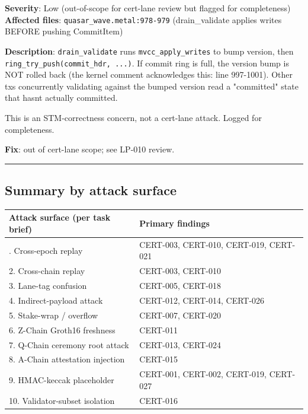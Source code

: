 \documentclass[
]{article}
\newcounter{none} %
\begin{document}
\textbf{Severity}: Low (out-of-scope for cert-lane review but flagged
for completeness) \textbf{Affected files}:
\texttt{quasar\_wave.metal:978-979} (drain\_validate applies writes
BEFORE pushing CommitItem)

\textbf{Description}: \texttt{drain\_validate} runs
\texttt{mvcc\_apply\_writes} to bump version, then
\texttt{ring\_try\_push(commit\_hdr,\ ...)}. If commit ring is full, the
version bump is NOT rolled back (the kernel comment acknowledges this:
line 997-1001). Other txs concurrently validating against the bumped
version read a "committed" state that hasn\textquotesingle t actually
committed.

This is an STM-correctness concern, not a cert-lane attack. Logged for
completeness.

\textbf{Fix}: out of cert-lane scope; see LP-010 review.

\begin{center}\rule{0.5\linewidth}{0.5pt}\end{center}

\subsection{Summary by attack surface}\label{summary-by-attack-surface}

{\def\LTcaptype{none} %
\begin{longtable}[]{@{}ll@{}}
\toprule\noalign{}
Attack surface (per task brief) & Primary findings \\
\midrule\noalign{}
\endhead
\bottomrule\noalign{}
\endlastfoot
1. Cross-epoch replay & CERT-003, CERT-010, CERT-019, CERT-021 \\
2. Cross-chain replay & CERT-003, CERT-010 \\
3. Lane-tag confusion & CERT-005, CERT-018 \\
4. Indirect-payload attack & CERT-012, CERT-014, CERT-026 \\
5. Stake-wrap / overflow & CERT-007, CERT-020 \\
6. Z-Chain Groth16 freshness & CERT-011 \\
7. Q-Chain ceremony root attack & CERT-013, CERT-024 \\
8. A-Chain attestation injection & CERT-015 \\
9. HMAC-keccak placeholder & CERT-001, CERT-002, CERT-019, CERT-027 \\
10. Validator-subset isolation & CERT-016 \\
\end{longtable}
}
\end{document}
